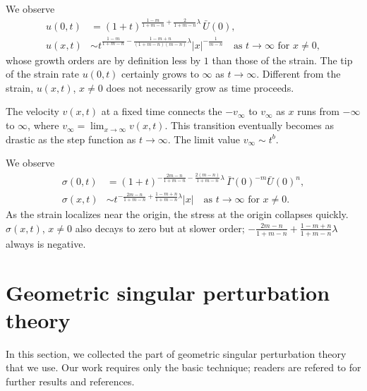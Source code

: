 \documentclass[a4paper,11pt]{article}
\def\bG{\bar{\Gamma}}
\def\bU{\bar{U}}
\numberwithin{step}{dummy}
\begin{document}
We observe
\begin{align*}
 u(0,t) &= (1+t)^{ \frac{1-m}{1+m-n}+ \frac{ 2 }{1+m-n}\lambda }\,\bU(0),\\
 u(x,t) &\sim t^{ \frac{1-m}{1+m-n}- \frac{ 1-m+n }{(1+m-n)(m-n)}\lambda } |x|^{-\frac{1}{m-n}} \quad \text{as $t \rightarrow \infty$ for $x\ne 0$},
\end{align*}
whose growth orders are by definition less by $1$ than those of the strain. The tip of the strain rate $u(0,t)$ certainly grows to $\infty$ as $t \rightarrow \infty$. Different from the strain, $u(x,t)$, $x\ne0$ does not necessarily grow as time proceeds. %

The velocity $v(x,t)$ at a fixed time connects the $-v_\infty$ to $v_\infty$ as $x$ runs from $-\infty$ to $\infty$, where $v_\infty = \lim_{x \rightarrow \infty} v(x,t)$. This transition eventually becomes as drastic as the step function as $t \rightarrow \infty$. The limit value $v_\infty\sim t^b$.
\medskip

We observe
\begin{align*}
 \sigma(0,t) &= (1+t)^{ -\frac{2m-n}{1+m-n} - \frac{ 2(m-n) }{1+m-n}\lambda}\,\bG(0)^{-m}\bU(0)^n,\\
 \sigma(x,t) &\sim t^{ -\frac{2m-n}{1+m-n} + \frac{ 1-m+n }{1+m-n}\lambda } |x| \quad \text{as $t \rightarrow \infty$ for $x\ne 0$}.
\end{align*}
As the strain localizes near the origin, the stress at the origin collapses quickly. $\sigma(x,t)$, $x\ne0$ also decays to zero but at slower order; $-\frac{2m-n}{1+m-n} + \frac{ 1-m+n }{1+m-n}\lambda$ always is negative. 


\appendix
\section{Geometric singular perturbation theory} \label{sec:geom}
In this section, we collected the part of geometric singular perturbation theory that we use. Our work  requires only  the basic technique;  readers are refered
to \cite{fenichel_persistence_1972,fenichel_geometric_1979,jones_geometric_1995,wiggins_normally_1994,KUEHN_2015} for further results and references.
\end{document}
